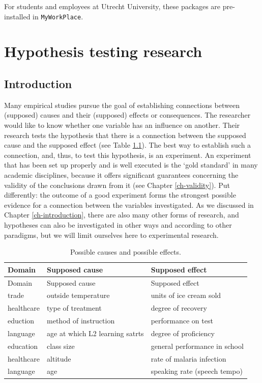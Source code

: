 \documentclass[
]{book}
\begin{document}
For students and employees at Utrecht University, these packages are pre-installed in \texttt{MyWorkPlace}.

\hypertarget{ch-research}{%
\chapter{Hypothesis testing research}\label{ch-research}}

\hypertarget{introduction}{%
\section{Introduction}\label{introduction}}

Many empirical studies pursue the goal of establishing connections between (supposed) causes and their (supposed) effects or consequences. The researcher would like to know whether one variable has an influence on another. Their research tests the hypothesis that there is a connection between the supposed cause and the supposed effect (see Table \ref{tab:causeeffect}). The best way to establish such a connection, and, thus, to test this hypothesis, is an experiment. An experiment that has been set up properly and is well executed is the `gold standard' in many academic disciplines, because it offers significant guarantees concerning the validity of the conclusions drawn from it (see Chapter \ref{ch-validity}). Put differently: the outcome of a good experiment forms the strongest possible evidence for a connection between the variables investigated. As we discussed in Chapter \ref{ch-introduction}, there are also many other forms of research, and hypotheses can also be investigated in other ways and according to other paradigms, but we will limit ourselves here to experimental research.

\begin{longtable}[]{@{}lll@{}}
\caption{\label{tab:causeeffect} Possible causes and possible effects.}\tabularnewline
\toprule
Domain & Supposed cause & Supposed effect \\
\midrule
\endfirsthead
\toprule
Domain & Supposed cause & Supposed effect \\
\midrule
\endhead
trade & outside temperature & units of ice cream sold \\
healthcare & type of treatment & degree of recovery \\
eduction & method of instruction & performance on test \\
language & age at which L2 learning satrts & degree of proficiency \\
education & class size & general performance in school \\
healthcare & altitude & rate of malaria infection \\
language & age & speaking rate (speech tempo) \\
\bottomrule
\end{longtable}
\end{document}

